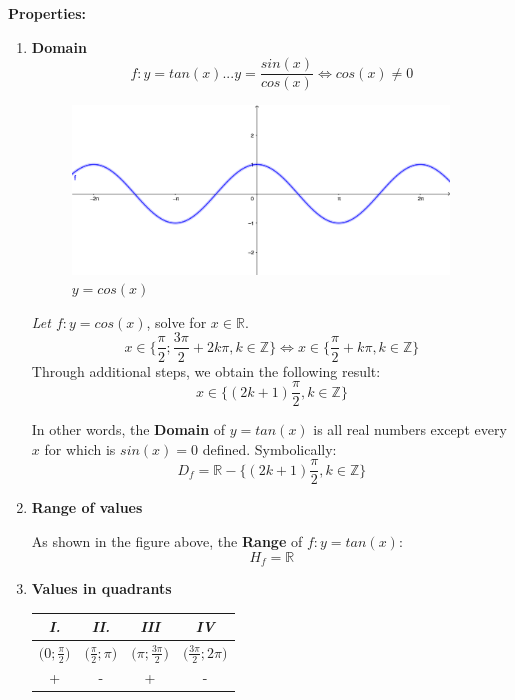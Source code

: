 \documentclass{article}
\begin{document}
\textbf{Properties: }
\begin{enumerate}

    \item \textbf{Domain}
    \[
    f:y=tan(x) ... y=\frac{sin(x)}{cos(x)} \Leftrightarrow cos(x) \neq 0
    \]
    
    \begin{figure}[htp]
        \centering
        \includegraphics[width=10cm]{cosine.png}
        \caption{$y=cos(x)$}
    \end{figure}    
    
    \textit{Let $f:y=cos(x)$}, solve for $x\in\mathbb{R}$.
    \[
    x \in \Big\{ \frac{\pi}{2}; \frac{3\pi}{2} + 2k\pi, k \in\mathbb{Z} \Big\} \Leftrightarrow
    x \in \Big\{ \frac{\pi}{2} + k\pi, k \in\mathbb{Z} \Big\}
    \]
    Through additional steps, we obtain the following result:
    \[
    x\in\{(2k+1)\frac{\pi}{2}, k\in\mathbb{Z} \}
    \]
    
    In other words, the \textbf{Domain} of $y=tan(x)$ is all real numbers except every $x$ for which is $sin(x) = 0$ defined. Symbolically:
    \[
    D_f= \mathbb{R}-\{ (2k+1)\frac{\pi}{2}, k\in\mathbb{Z} \}
    \]
    
    \item \textbf{Range of values}
    
    As shown in the figure above, the \textbf{Range} of $f: y=tan(x)$:
    \[
    H_f=\mathbb{R}
    \]
    
    \item \textbf{Values in quadrants}
    
    \begin{center}
    \begin{tabular}{||c c c c||} 
    \hline
    \textit{I.} & \textit{II.} & \textit{III} & \textit{IV} \\ [0.5ex] 
    \hline\hline
    $\Big(0;\frac{\pi}{2}\Big)$ & $\Big(\frac{\pi}{2};\pi\Big)$ & $\Big(\pi;\frac{3\pi}{2}\Big)$ & 
    $\Big(\frac{3\pi}{2};2\pi\Big)$ \\
    \hline
    + & - & + & - \\ [1ex] 
    \hline
    \end{tabular}
    \end{center}
    

\end{enumerate}
\end{document}
